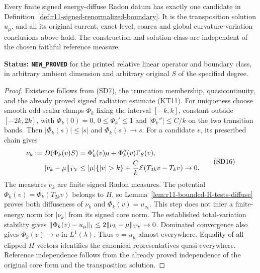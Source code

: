 \begin{theorem}
\label{thm:r11-signed-renormalized-Dirichlet}
Every finite signed energy-diffuse Radon datum has exactly one
candidate in Definition~\ref{def:r11-signed-renormalized-boundary}.
It is the transposition solution $u_\mu$, and all its original
current, exact-level, coarea and global curvature-variation
conclusions above hold.  The construction and solution class
are independent of the chosen faithful reference measure.
\end{theorem}

\noindent\textbf{Status: \texttt{NEW\_PROVED}} for the
printed relative linear operator and boundary class, in
arbitrary ambient dimension and arbitrary original $S$ of
the specified degree.

\begin{proof}
Existence follows from (SD7), the truncation membership,
quasicontinuity, and the already proved signed radiation
estimate (KT11).  For uniqueness choose smooth odd scalar
clamps $\Phi_k$ fixing the interval $[-k,k]$, constant
outside $[-2k,2k]$, with $\Phi_k(0)=0$,
$0\le\Phi_k'\le1$ and
$|\Phi_k''|\le C/k$ on the two transition bands.
Then $|\Phi_k(s)|\le|s|$ and $\Phi_k(s)\to s$.
For a candidate $v$, its prescribed chain gives
\[
 \begin{split}
 \nu_k:=D(\Phi_k(v)S)
       &=\Phi_k'(v)\mu+\Phi_k''(v)\Gamma_S(v),\\
 \|\nu_k-\mu\|_{\rm TV}
       &\le |\mu|\{|v|>k\}
                +\frac Ck\mathcal E(T_{2k}v-T_kv)\to0.
 \end{split}
 \tag{SD16}
\]
The measures $\nu_k$ are finite signed Radon measures.
The potential $\Phi_k(v)=\Phi_k(T_{2k}v)$ belongs to $H$,
so Lemma~\ref{lem:r11-bounded-H-tests-diffuse} proves
both diffuseness of $\nu_k$ and
$\Phi_k(v)=u_{\nu_k}$.  This step does not infer a
finite-energy norm for $|\nu_k|$ from its signed core norm.
The established total-variation stability gives
$\|\Phi_k(v)-u_\mu\|_1\le2\|\nu_k-\mu\|_{\rm TV}\to0$.
Dominated convergence also gives $\Phi_k(v)\to v$ in
$L^1(\lambda)$.  Thus $v=u_\mu$ almost everywhere.
Equality of all clipped $H$ vectors identifies the canonical
representatives quasi-everywhere.  Reference independence
follows from the already proved independence of the original
core form and the transposition solution.
\end{proof}

